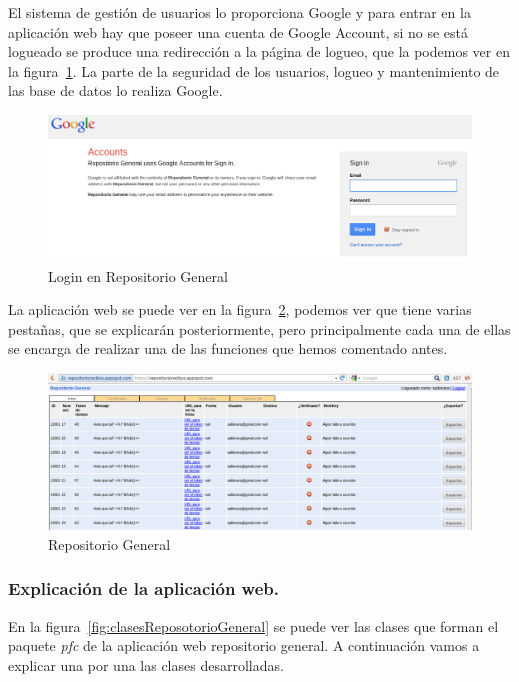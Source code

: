 El sistema de gestión de usuarios lo proporciona Google y para entrar en la aplicación web hay que poseer una cuenta de Google Account, si no se está logueado se produce una redirección a la página de logueo, que la podemos ver en la figura~\ref{fig:logueoRepoGeneral}. La parte de la seguridad de los usuarios, logueo y mantenimiento de las base de datos lo realiza Google.

\begin{figure}[h]
  \centering
    \includegraphics[scale=0.5]{./GoogleAppEngine/imagenes/login_repositorio_general.png}
  \caption{Login en Repositorio General}
  \label{fig:logueoRepoGeneral}
\end{figure}

La aplicación web se puede ver en la figura~\ref{fig:repositorio_general}, podemos ver que tiene varias pestañas, que se explicarán posteriormente, pero principalmente cada una de ellas se encarga de realizar una de las funciones que hemos comentado antes.

\begin{figure}[h]
  \centering
    \includegraphics[scale=0.4]{./GoogleAppEngine/imagenes/repositorio_general.png}
  \caption{Repositorio General}
  \label{fig:repositorio_general}
\end{figure}

\subsubsection{Explicación de la aplicación web.}

En la figura~\ref{fig:clasesReposotorioGeneral} se puede ver las clases que forman el paquete \textit{pfc} de la aplicación web repositorio general. A continuación vamos a explicar una por una las clases desarrolladas.

